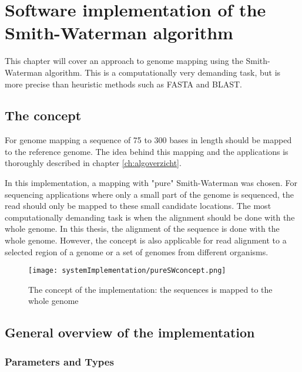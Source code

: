 
\chapter{Software implementation of the Smith-Waterman algorithm}
\label{ch:SoftwareImpl}

This chapter will cover an approach to genome mapping using the Smith-Waterman algorithm. This is a computationally very demanding task, but is more precise than heuristic methods such as FASTA and BLAST.

\section{The concept}
For genome mapping a sequence of 75 to 300 bases in length should be mapped to the reference genome. The idea behind this mapping and the applications is thoroughly described in chapter \ref{ch:algoverzicht}.

In this implementation, a mapping with "pure" Smith-Waterman was chosen. For sequencing applications where only a small part of the genome is sequenced, the read should only be mapped to these small candidate locations. The most computationally demanding task is when the alignment should be done with the whole genome. In this thesis, the alignment of the sequence is done with the whole genome. However, the concept is also applicable for read alignment to a selected region of a genome or a set of genomes from different organisms.

\begin{figure}[H]
	\centering
	\texttt{[image: systemImplementation/pureSWconcept.png]}
	\caption{The concept of the implementation: the sequences is mapped to the whole genome}
	\label{fig:concept}
\end{figure}


\section{General overview of the implementation}

\subsection{Parameters and Types}

